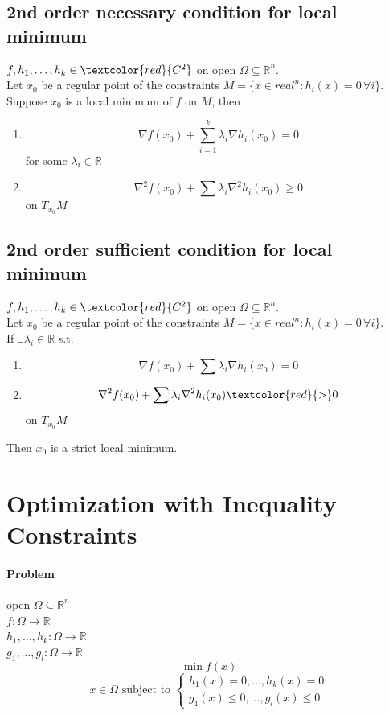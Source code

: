 \documentclass[11pt]{article}
\newcommand{\real}[0]{\mathbb{R}}
\begin{document}
\subsection{2nd order necessary condition for local minimum}
$f, h_1, \hdots, h_k \in \textcolor{red}{C^2}$ on open $\Omega \subseteq \real^n$. \\
Let $x_0$ be a regular point of the constraints $ M = \{ x \in real^n: h_i(x) = 0 \, \forall i\}$. \\
Suppose $x_0$ is a local minimum of $f$ on $M$, then
\begin{enumerate}
	\item $$\nabla f(x_0) + \sum_{i=1}^k \lambda_i \nabla h_i(x_0) = 0$$
	for some $\lambda_i \in \real$
	\item $$\nabla^2 f(x_0) + \sum \lambda_i \nabla^2 h_i(x_0) \geq 0$$ on $T_{x_0}M$
\end{enumerate}

\subsection{2nd order sufficient condition for local minimum}
$f, h_1, \hdots, h_k \in \textcolor{red}{C^2}$ on open $\Omega \subseteq \real^n$. \\
Let $x_0$ be a regular point of the constraints $ M = \{ x \in real^n: h_i(x) = 0 \, \forall i\}$. \\
If $\exists \lambda_i \in \real$ s.t.
\begin{enumerate}
	\item $$ \nabla f(x_0) + \sum \lambda_i \nabla h_i(x_0) = 0$$
	\item $$ \nabla^2 f(x_0) + \sum \lambda_i \nabla^2 h_i(x_0) \textcolor{red}{>} 0$$ on $T_{x_0} M$
\end{enumerate}
Then $x_0$ is a strict local minimum.

\section{Optimization with Inequality Constraints}
\paragraph{Problem}
open $\Omega \subseteq \real^n$\\
$f: \Omega \rightarrow \real$ \\
$h_1, \hdots, h_k: \Omega \rightarrow \real$ \\
$g_1, \hdots, g_l: \Omega \rightarrow \real$ \\
$$\min f(x) $$
$$x \in \Omega \text{ subject to } 
\begin{cases}
	h_1(x) = 0, \hdots, h_k(x) = 0 \\
	g_1(x) \leq 0, \hdots, g_l(x) \leq 0
\end{cases}$$
\end{document}
